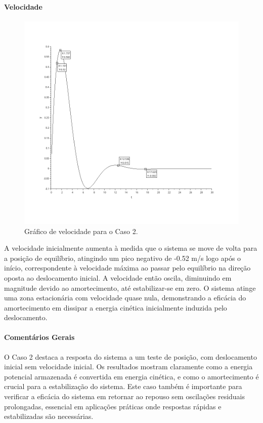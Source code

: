 \paragraph{Velocidade}
\begin{figure}[H]
    \centering
    \includegraphics[height=0.7\textwidth]{final/2-atividade/assets/velocidade-caso-2.png}
    \caption{Gráfico de velocidade para o Caso 2.}
\end{figure}
A velocidade inicialmente aumenta à medida que o sistema se move de volta para a posição de equilíbrio, atingindo um pico negativo de -0.52 m/s logo após o início, correspondente à velocidade máxima ao passar pelo equilíbrio na direção oposta ao deslocamento inicial. A velocidade então oscila, diminuindo em magnitude devido ao amortecimento, até estabilizar-se em zero. O sistema atinge uma zona estacionária com velocidade quase nula, demonstrando a eficácia do amortecimento em dissipar a energia cinética inicialmente induzida pelo deslocamento.

\paragraph{Comentários Gerais}
O Caso 2 destaca a resposta do sistema a um teste de posição, com deslocamento inicial sem velocidade inicial. Os resultados mostram claramente como a energia potencial armazenada é convertida em energia cinética, e como o amortecimento é crucial para a estabilização do sistema. Este caso também é importante para verificar a eficácia do sistema em retornar ao repouso sem oscilações residuais prolongadas, essencial em aplicações práticas onde respostas rápidas e estabilizadas são necessárias.

